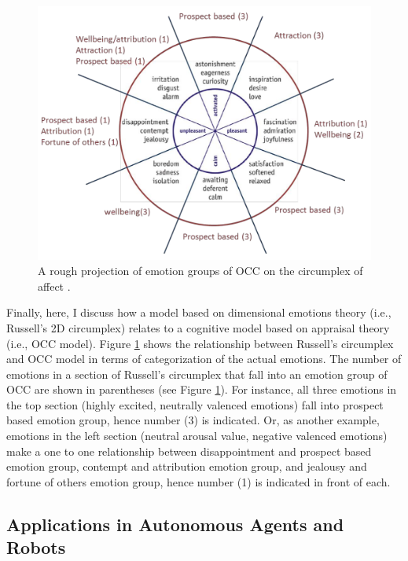 \documentclass[12pt]{report}
\begin{document}
\begin{figure}[tbh]
  \center
  \includegraphics[width=.9\textwidth]{figure/occ-circumplex-mapping.png}
  \caption{A rough projection of emotion groups of OCC on the circumplex of
  affect \cite{ahmadpour:occ-dimensional-comparison}.}
  \label{fig:occ-circumplex}
\end{figure}

Finally, here, I discuss how a model based on dimensional emotions theory
(i.e., Russell's 2D circumplex) relates to a cognitive model based on appraisal
theory (i.e., OCC model). Figure \ref{fig:occ-circumplex} shows the relationship
between Russell's circumplex and OCC model in terms of categorization of the
actual emotions. The number of emotions in a section of Russell's circumplex
that fall into an emotion group of OCC are shown in parentheses (see Figure
\ref{fig:occ-circumplex}). For instance, all three emotions in the top section
(highly excited, neutrally valenced emotions) fall into prospect based emotion
group, hence number (3) is indicated. Or, as another example, emotions in the
left section (neutral arousal value, negative valenced emotions) make a one to
one relationship between disappointment and prospect based emotion group,
contempt and attribution emotion group, and jealousy and fortune of others
emotion group, hence number (1) is indicated in front of each.

\subsection{Applications in Autonomous Agents and Robots}
\label{sec:applications}
\end{document}
